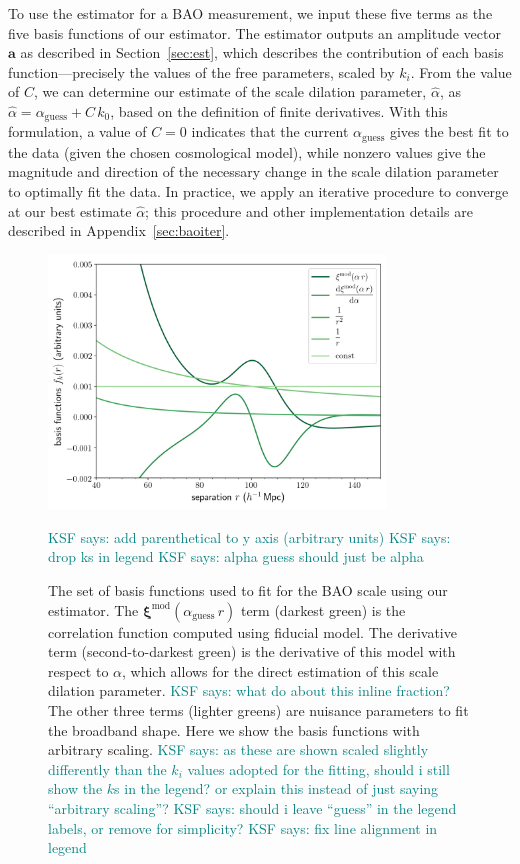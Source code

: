 \documentclass[modern]{aastex62}
\newcommand{\bld}[1]{\bm{#1}} %
\newcommand{\KSF}[1]{\textcolor{teal}{KSF says: #1}}
\begin{document}
To use the estimator for a BAO measurement, we input these five terms as the five basis functions of our estimator.
The estimator outputs an amplitude vector $\bld{a}$ as described in Section~\ref{sec:est}, which describes the contribution of each basis function---precisely the values of the free parameters, scaled by $k_i$.
From the value of $C$, we can determine our estimate of the scale dilation parameter, $\hat{\alpha}$, as $\hat{\alpha} = \alpha_\mathrm{guess} + C\,k_0$, based on the definition of finite derivatives. 
With this formulation, a value of $C=0$ indicates that the current $\alpha_\mathrm{guess}$ gives the best fit to the data (given the chosen cosmological model), while nonzero values give the magnitude and direction of the necessary change in the scale dilation parameter to optimally fit the data.
In practice, we apply an iterative procedure to converge at our best estimate $\hat{\alpha}$; this procedure and other implementation details are described in Appendix~\ref{sec:baoiter}.

\begin{figure}[ht]
\centering
    \includegraphics[width=0.8\textwidth]{bao_bases}
    \caption{The set of basis functions used to fit for the BAO scale using our estimator. The $\bld{\xi}^\mathrm{mod}(\alpha_\mathrm{guess}\,r)$ term (darkest green) is the correlation function computed using fiducial model. The derivative term (second-to-darkest green) is the derivative of this model with respect to $\alpha$, which allows for the direct estimation of this scale dilation parameter. \KSF{what do about this inline fraction?} The other three terms (lighter greens) are nuisance parameters to fit the broadband shape. Here we show the basis functions with arbitrary scaling. \KSF{as these are shown scaled slightly differently than the $k_i$ values adopted for the fitting, should i still show the $k$s in the legend? or explain this instead of just saying ``arbitrary scaling''?} \KSF{should i leave ``guess'' in the legend labels, or remove for simplicity?} \KSF{fix line alignment in legend}} \KSF{add parenthetical to y axis (arbitrary units) \KSF{drop ks in legend}} \KSF{alpha guess should just be alpha}
    \label{fig:bao_bases}
\end{figure}
\end{document}

